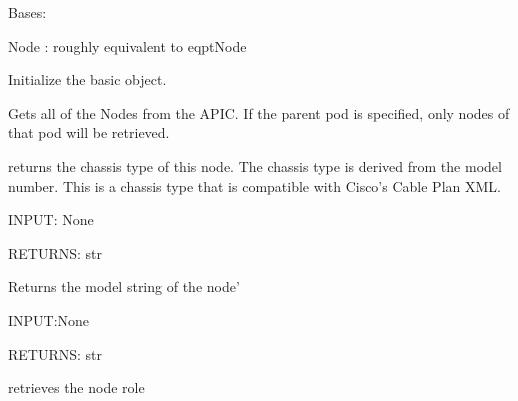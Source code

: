 \documentclass[letterpaper,10pt,english]{sphinxmanual}
\begin{document}
\begin{fulllineitems}
\label{aciphysobject:aciphysobject.Node}
Bases: {\hyperref[aciphysobject:aciphysobject.BaseACIPhysObject]{}}

Node :  roughly equivalent to eqptNode

Initialize the basic object.

\begin{fulllineitems}
\label{aciphysobject:aciphysobject.Node.get}
Gets all of the Nodes from the APIC.  If the parent pod is specified,
only nodes of that pod will be retrieved.

\end{fulllineitems}


\begin{fulllineitems}
\label{aciphysobject:aciphysobject.Node.get_chassisType}
returns the chassis type of this node.  The chassis type is derived from the model number.
This is a chassis type that is compatible with Cisco's Cable Plan XML.

INPUT: None

RETURNS: str

\end{fulllineitems}


\begin{fulllineitems}
\label{aciphysobject:aciphysobject.Node.get_model}
Returns the model string of the node'

INPUT:None

RETURNS: str

\end{fulllineitems}


\begin{fulllineitems}
\label{aciphysobject:aciphysobject.Node.get_role}
retrieves the node role


\end{fulllineitems}
\end{fulllineitems}
\end{document}
